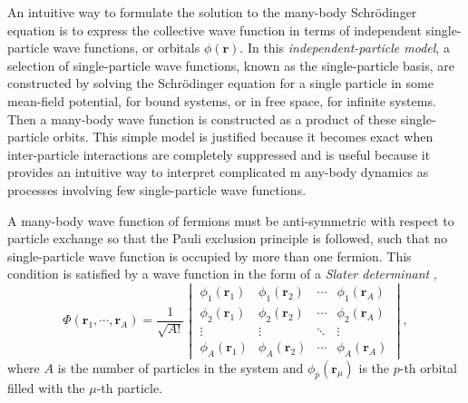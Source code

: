 \documentclass[thesis.tex]{subfiles}
\begin{document}
An intuitive way to formulate the solution to the many-body Schr\"{o}dinger equation is to express the collective wave function in terms of independent single-particle wave functions, or orbitals $\phi\left(\mathbf{r}\right)$.  In this \textit{independent-particle model}, a selection of single-particle wave functions, known as the single-particle basis, are constructed by solving the Schr\"{o}dinger equation for a single particle in some mean-field potential, for bound systems, or in free space, for infinite systems.  Then a many-body wave function is constructed as a product of these single-particle orbits.  This simple model is justified because it becomes exact when inter-particle interactions are completely suppressed and is useful because it provides an intuitive way to interpret complicated m any-body dynamics as processes involving few single-particle wave functions.

A many-body wave function of fermions must be anti-symmetric with respect to particle exchange so that the Pauli exclusion principle is followed, such that no single-particle wave function is occupied by more than one fermion.  This condition is satisfied by a wave function in the form of a \textit{Slater determinant} \cite{SLATER1929},
\begin{equation} \label{eq:slaterdeterminant}
  \Phi\left(\mathbf{r}_{1},\cdots,\mathbf{r}_{A}\right) =
  \frac{1}{\sqrt{A!}}\begin{vmatrix}
    \phi_{1}\left(\mathbf{r}_{1}\right) & \phi_{1}\left(\mathbf{r}_{2}\right) & \cdots & \phi_{1}\left(\mathbf{r}_{A}\right) \\
    \phi_{2}\left(\mathbf{r}_{1}\right) & \phi_{2}\left(\mathbf{r}_{2}\right) & \cdots & \phi_{2}\left(\mathbf{r}_{A}\right) \\
    \vdots & \vdots & \ddots & \vdots \\
    \phi_{A}\left(\mathbf{r}_{1}\right) & \phi_{A}\left(\mathbf{r}_{2}\right) & \cdots & \phi_{A}\left(\mathbf{r}_{A}\right)
  \end{vmatrix},
\end{equation}
where $A$ is the number of particles in the system and $\phi_{p}\left(\mathbf{r}_{\mu}\right)$ is the $p$-th orbital filled with the $\mu$-th particle.
\end{document}
